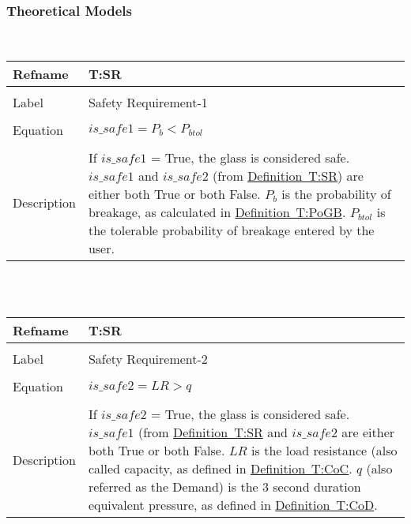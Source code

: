 \documentclass[12pt]{article}
\begin{document}
\subsubsection{Theoretical Models}
\label{Sec:TM}
~\newline
\noindent \begin{minipage}{\textwidth}
\begin{tabular}{p{} p{}}
\toprule \textbf{Refname} & \textbf{T:SR}
\label{T:SR}
\\ \midrule \\
Label & Safety Requirement-1
\\ \midrule \\
Equation & $is\_safe1=P_{b}<P_{btol}$
\\ \midrule \\
Description & If $is\_safe1$ = True, the glass is considered safe. $is\_safe1$ and $is\_safe2$ (from \hyperref[T:SR]{Definition~T:SR}) are either both True or both False. $P_{b}$ is the probability of breakage, as calculated in \hyperref[T:PoGB]{Definition~T:PoGB}. $P_{btol}$ is the tolerable probability of breakage entered by the user.
\\ \bottomrule \end{tabular}
\end{minipage}\\
~\newline
\noindent \begin{minipage}{\textwidth}
\begin{tabular}{p{} p{}}
\toprule \textbf{Refname} & \textbf{T:SR}
\label{T:SR}
\\ \midrule \\
Label & Safety Requirement-2
\\ \midrule \\
Equation & $is\_safe2=LR>q$
\\ \midrule \\
Description & If $is\_safe2$ = True, the glass is considered safe. $is\_safe1$ (from \hyperref[T:SR]{Definition~T:SR} and $is\_safe2$ are either both True or both False. $LR$ is the load resistance (also called capacity, as defined in \hyperref[T:CoC]{Definition~T:CoC}. $q$ (also referred as the Demand) is the 3 second duration equivalent pressure, as defined in \hyperref[T:CoD]{Definition~T:CoD}.
\\ \bottomrule \end{tabular}
\end{minipage}\\
\end{document}
